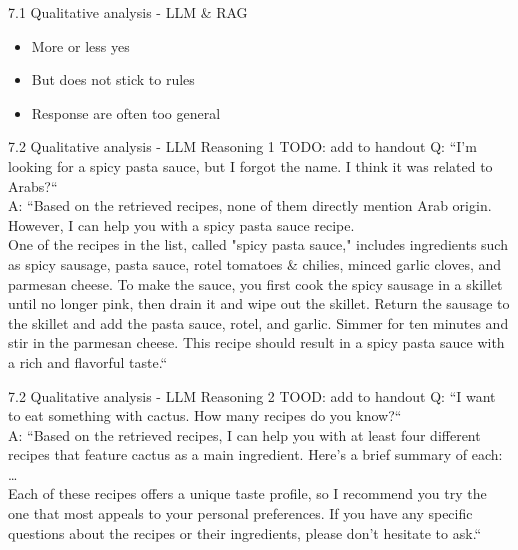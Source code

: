 \documentclass{beamer}
\begin{document}
\begin{frame}{7.1 Qualitative analysis - LLM \& RAG}
  \begin{itemize}
    \item More or less yes
    \item But does not stick to rules
    \item Response are often too general
  \end{itemize}
\end{frame}
\begin{frame}{7.2 Qualitative analysis - LLM Reasoning 1}
  TODO: add to handout
  Q: ``I'm looking for a spicy pasta sauce, but I forgot the name. I think it was related to Arabs?``\\
  A: ``Based on the retrieved recipes, none of them directly mention Arab origin. However, I can help you with a spicy pasta sauce recipe.\\

  One of the recipes in the list, called "spicy pasta sauce," includes ingredients such as spicy sausage, pasta sauce, rotel tomatoes \& chilies,
  minced garlic cloves, and parmesan cheese. To make the sauce, you first cook the spicy sausage in a skillet until no longer pink,
  then drain it and wipe out the skillet. Return the sausage to the skillet and add the pasta sauce, rotel, and garlic.
  Simmer for ten minutes and stir in the parmesan cheese. This recipe should result in a spicy pasta sauce with a rich and flavorful taste.``
\end{frame}

\begin{frame}{7.2 Qualitative analysis - LLM Reasoning 2}
  TOOD: add to handout
  Q: ``I want to eat something with cactus. How many recipes do you know?``\\
  A: ``Based on the retrieved recipes, I can help you with at least four different recipes that feature cactus as a main ingredient. Here's a brief summary of each:\\
  \ldots \\
  Each of these recipes offers a unique taste profile, so I recommend you try the one that most appeals to your personal preferences. If you have any specific questions about the recipes or their ingredients, please don't hesitate to ask.``
\end{frame}
\end{document}
